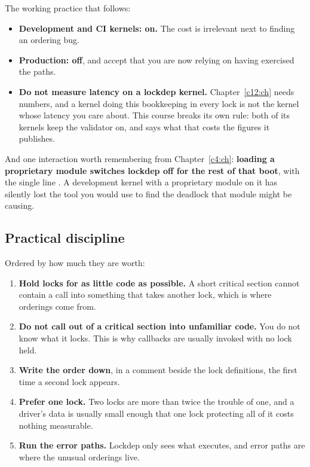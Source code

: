 The working practice that follows:
\begin{itemize}
  \item \textbf{Development and CI kernels: on.} The cost is irrelevant next to finding an ordering
    bug.
  \item \textbf{Production: off}, and accept that you are now relying on having exercised the paths.
  \item \textbf{Do not measure latency on a lockdep kernel.} Chapter~\ref{c12:ch} needs numbers, and
    a kernel doing this bookkeeping in every lock is not the kernel whose latency you care about.
    This course breaks its own rule: both of its kernels keep the validator on, and
     says what that costs the figures it publishes.
\end{itemize}
And one interaction worth remembering from Chapter~\ref{c4:ch}: \textbf{loading a proprietary module
switches lockdep off for the rest of that boot}, with the single line . A development kernel with a proprietary module on it has silently lost the
tool you would use to find the deadlock that module might be causing.

\subsection{Practical discipline}
\label{c7:app:b7}

Ordered by how much they are worth:
\begin{enumerate}
  \item \textbf{Hold locks for as little code as possible.} A short critical section cannot contain
    a call into something that takes another lock, which is where orderings come from.
  \item \textbf{Do not call out of a critical section into unfamiliar code.} You do not know what it
    locks. This is why callbacks are usually invoked with no lock held.
  \item \textbf{Write the order down}, in a comment beside the lock definitions, the first time a
    second lock appears.
  \item \textbf{Prefer one lock.} Two locks are more than twice the trouble of one, and a driver's
    data is usually small enough that one lock protecting all of it costs nothing measurable.
  \item \textbf{Run the error paths.} Lockdep only sees what executes, and error paths are where the
    unusual orderings live.
\end{enumerate}

